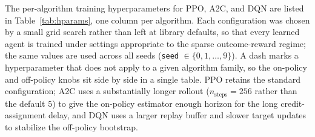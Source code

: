 The per-algorithm training hyperparameters for PPO, A2C, and DQN are listed in Table~\ref{tab:hparams}, one column per algorithm. Each configuration was chosen by a small grid search rather than left at library defaults, so that every learned agent is trained under settings appropriate to the sparse outcome-reward regime; the same values are used across all \NumSeeds{} seeds (\texttt{seed} $\in \{0, 1, \ldots, 9\}$). A dash marks a hyperparameter that does not apply to a given algorithm family, so the on-policy and off-policy knobs sit side by side in a single table. PPO retains the standard configuration; A2C uses a substantially longer rollout ($n_{\text{steps}} = 256$ rather than the default $5$) to give the on-policy estimator enough horizon for the long credit-assignment delay, and DQN uses a larger replay buffer and slower target updates to stabilize the off-policy bootstrap.

